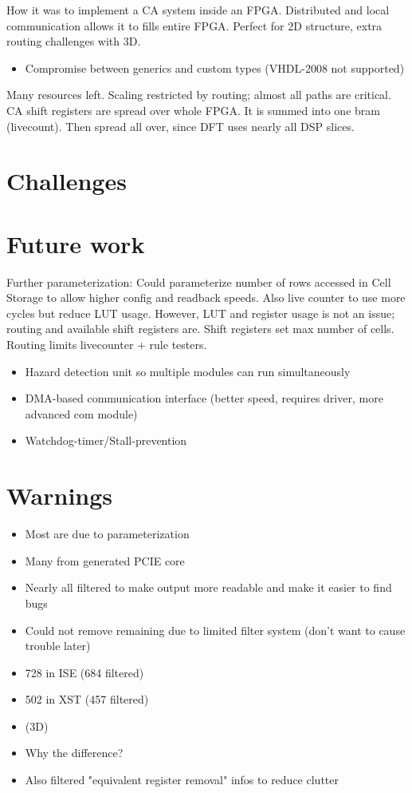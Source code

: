 \TODO
How it was to implement a CA system inside an FPGA.
Distributed and local communication allows it to fills entire FPGA.
Perfect for 2D structure, extra routing challenges with 3D.

\begin{itemize}
    \item Compromise between generics and custom types (VHDL-2008 not supported)
\end{itemize}

\TODO
Many resources left.
Scaling restricted by routing; almost all paths are critical.
CA shift registers are spread over whole FPGA.
It is summed into one bram (livecount).
Then spread all over, since DFT uses nearly all DSP slices.

\section{Challenges}
\label{sec:challenges}

\TODO

\section{Future work}

\TODO

Further parameterization:
Could parameterize number of rows accessed in Cell Storage to allow higher config and readback speeds.
Also live counter to use more cycles but reduce LUT usage.
However, LUT and register usage is not an issue; routing and available shift registers are.
Shift registers set max number of cells.
Routing limits livecounter + rule testers.

\begin{itemize}
    \item Hazard detection unit so multiple modules can run simultaneously
    \item DMA-based communication interface (better speed, requires driver, more advanced com module)
    \item Watchdog-timer/Stall-prevention
\end{itemize}

\section{Warnings}

\begin{itemize}
    \item Most are due to parameterization
    \item Many from generated PCIE core
    \item Nearly all filtered to make output more readable and make it easier to find bugs
    \item Could not remove remaining due to limited filter system (don't want to cause trouble later)
    \item 728 in ISE (684 filtered)
    \item 502 in XST (457 filtered)
    \item (3D)
    \item Why the difference?
    \item Also filtered "equivalent register removal" infos to reduce clutter
\end{itemize}
